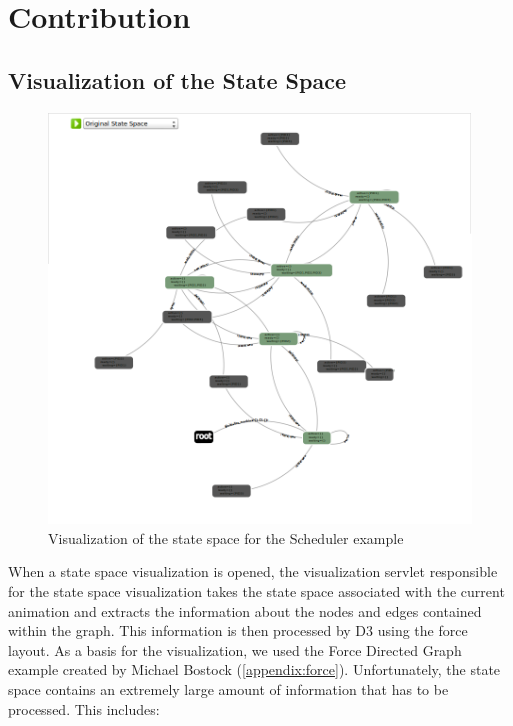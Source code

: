 \section{Contribution}

\subsection{Visualization of the State Space}

\begin{figure}[h!]
\centering
\includegraphics[width=15cm]{bilder/ss-zoomedOut.png}
\caption{Visualization of the state space for the Scheduler example}
\label{zoomedOut}
\end{figure}

When a state space visualization is opened, the visualization servlet responsible for the state space visualization takes the state space associated with the current animation and extracts the information about the nodes and edges contained within the graph. This information is then processed by D3 using the force layout. As a basis for the visualization, we used the Force Directed Graph example created by Michael Bostock (\ref{appendix:force}). Unfortunately, the state space contains an extremely large amount of information that has to be processed. This includes:

